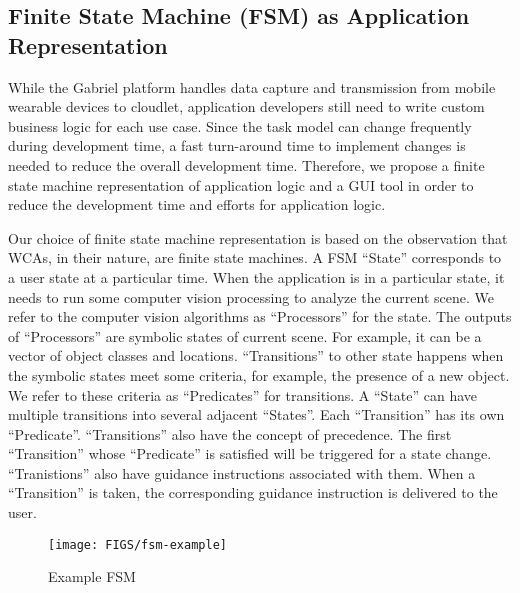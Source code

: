 \subsection{Finite State Machine (FSM) as Application Representation}

While the Gabriel platform handles data capture and transmission from mobile
wearable devices to cloudlet, application developers still need to write custom
business logic for each use case. Since the task model can change frequently
during development time, a fast turn-around time to implement changes is needed
to reduce the overall development time. Therefore, we propose a finite state
machine representation of application logic and a GUI tool in order to reduce
the development time and efforts for application logic. 

Our choice of finite state machine representation is based on the observation
that WCAs, in their nature, are finite state machines. A FSM ``State''
corresponds to a user state at a particular time. When the application is in a
particular state, it needs to run some computer vision processing to analyze the
current scene. We refer to the computer vision algorithms as ``Processors'' for
the state. The outputs of ``Processors'' are symbolic states of current scene.
For example, it can be a vector of object classes and locations. ``Transitions''
to other state happens when the symbolic states meet some criteria, for example,
the presence of a new object. We refer to these criteria as ``Predicates'' for
transitions. A ``State'' can have multiple transitions into several adjacent
``States''. Each ``Transition'' has its own ``Predicate''. ``Transitions'' also
have the concept of precedence. The first ``Transition'' whose ``Predicate'' is
satisfied will be triggered for a state change. ``Tranistions'' also have
guidance instructions associated with them. When a ``Transition'' is taken, the
corresponding guidance instruction is delivered to the user.


\begin{figure}
  \centering
  \texttt{[image: FIGS/fsm-example]}
	\caption{Example FSM}
    \label{figs:fsm-example}
\end{figure}


